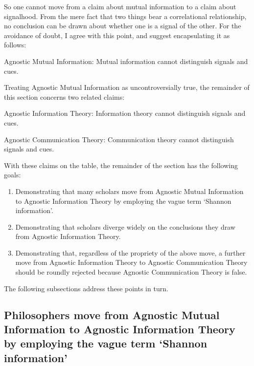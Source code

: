 So one cannot move from a claim about mutual information to a claim about signalhood.
From the mere fact that two things bear a correlational relationship, no conclusion can be drawn about whether one is a signal of the other.
For the avoidance of doubt, I agree with this point, and suggest encapsulating it as follows:

\begin{myquote}
{\sc Agnostic Mutual Information}: Mutual information cannot distinguish signals and cues.
\end{myquote}

\noindent Treating {\sc Agnostic Mutual Information} as uncontroversially true, the remainder of this section concerns two related claims:

\begin{myquote}
{\sc Agnostic Information Theory}: Information theory cannot distinguish signals and cues.
\end{myquote}

\begin{myquote}
{\sc Agnostic Communication Theory}: Communication theory cannot distinguish signals and cues.
\end{myquote}

\noindent With these claims on the table, the remainder of the section has the following goals:

\begin{enumerate}
    \item Demonstrating that many scholars move from {\sc Agnostic Mutual Information} to {\sc Agnostic Information Theory} by employing the vague term `Shannon information'.
    \item Demonstrating that scholars diverge widely on the conclusions they draw from {\sc Agnostic Information Theory}.
    \item Demonstrating that, regardless of the propriety of the above move, a further move from {\sc Agnostic Information Theory} to {\sc Agnostic Communication Theory} should be roundly rejected because {\sc Agnostic Communication Theory} is false.
\end{enumerate}

\noindent The following subsections address these points in turn.

\subsection{\sloppy Philosophers move from {\sc Agnostic Mutual Information} to {\sc Agnostic Information Theory} by employing the vague term `Shannon information'}

